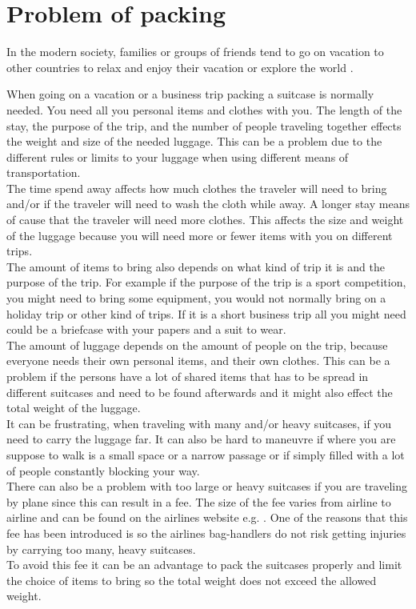 \section{Problem of packing}
In the modern society, families or groups of friends tend to go on vacation to other countries to relax and enjoy their vacation or explore the world \citep{danskecharter}.

When going on a vacation or a business trip packing a suitcase is normally needed. You need all you personal items and clothes with you. The length of the stay, the purpose of the trip, and the number of people traveling together effects the weight and size of the needed luggage. This can be a problem due to the different rules or limits to your luggage when using different means of transportation.\\

The time spend away affects how much clothes the traveler will need to bring and/or if the traveler will need to wash the cloth while away. A longer stay means of cause that the traveler will need more clothes. This affects the size and weight of the luggage because you will need more or fewer items with you on different trips.\\
 
The amount of items to bring also depends on what kind of trip it is and the purpose of the trip. For example if the purpose of the trip is a sport competition, you might need to bring some equipment, you would not normally bring on a holiday trip or other kind of trips. If it is a short business trip all you might need could be a briefcase with your papers and a suit to wear.\\

The amount of luggage depends on the amount of people on the trip, because everyone needs their own personal items, and their own clothes. This can be a problem if the persons have a lot of shared items that has to be spread in different suitcases and need to be found afterwards and it might also effect the total weight of the luggage.\\

It can be frustrating, when traveling with many and/or heavy suitcases, if you need to carry the luggage far. It can also be hard to maneuvre if where you are suppose to walk is a small space or a narrow passage or if simply filled with a lot of people constantly blocking your way.\\
 
There can also be a problem with too large or heavy suitcases if you are traveling by plane since this can result in a fee. The size of the fee varies from airline to airline and can be found on the airlines website e.g.  \citep{altombag}. One of the reasons that this fee has been introduced is so the airlines bag-handlers do not risk getting injuries by carrying too many, heavy suitcases.\\ 
To avoid this fee it can be an advantage to pack the suitcases properly and limit the choice of items to bring so the total weight does not exceed the allowed weight.\\

